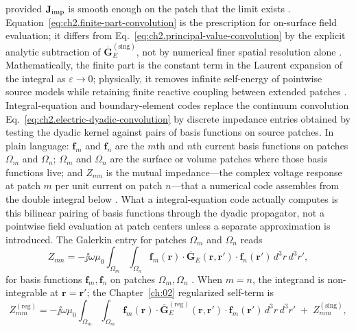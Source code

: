 provided \(\mathbf{J}_{\mathrm{imp}}\) is smooth enough on the patch that the limit exists
\cite{harrington2001}. Equation~\eqref{eq:ch2.finite-part-convolution} is the
prescription for on-surface field evaluation; it differs
from Eq.~\eqref{eq:ch2.principal-value-convolution} by the explicit analytic
subtraction of \(\overline{\mathbf{G}}_{E}^{\mathrm{(sing)}}\), not by numerical
finer spatial resolution alone \cite{stratton1941}. Mathematically, the finite part is the
constant term in the Laurent expansion of the integral as \(\varepsilon\to 0\);
physically, it removes infinite self-energy of pointwise source models while retaining
finite reactive coupling between extended patches \cite{jackson1999}.
Integral-equation and boundary-element codes replace the continuum convolution
Eq.~\eqref{eq:ch2.electric-dyadic-convolution} by discrete impedance entries obtained
by testing the dyadic kernel against pairs of basis functions on source patches. In plain
language: $\mathbf{f}_m$ and $\mathbf{f}_n$ are the $m$th and $n$th current basis functions
on patches $\Omega_m$ and $\Omega_n$; $\Omega_m$ and $\Omega_n$ are the surface or volume
patches where those basis functions live; and $Z_{mn}$ is the mutual impedance---the
complex voltage response at patch $m$ per unit current on patch $n$---that a numerical code
assembles from the double integral below \cite{harrington2001}. What a integral-equation code actually
computes is this bilinear pairing of basis functions through the dyadic propagator, not a
pointwise field evaluation at patch centers unless a separate approximation is introduced.
The Galerkin entry for patches \(\Omega_m\) and \(\Omega_n\) reads
\begin{equation}
\label{eq:ch2.mom-dyadic-entry}
Z_{mn}
=
-\jj\omega\mu_0\int_{\Omega_m}\int_{\Omega_n}
\mathbf{f}_m(\mathbf{r})\cdot
\overline{\mathbf{G}}_{E}(\mathbf{r},\mathbf{r}')\cdot
\mathbf{f}_n(\mathbf{r}')\,d^{3}r\,d^{3}r',
\end{equation}
for basis functions \(\mathbf{f}_m,\mathbf{f}_n\) on patches \(\Omega_m,\Omega_n\)
\cite{harrington2001}. When \(m=n\), the integrand is non-integrable at
\(\mathbf{r}=\mathbf{r}'\); the Chapter~\ref{ch:02} regularized self-term is
\begin{equation}
\label{eq:ch2.mom-self-term-regularized}
Z_{mm}^{\mathrm{(reg)}}
=
-\jj\omega\mu_0\int_{\Omega_m}\int_{\Omega_m}
\mathbf{f}_m(\mathbf{r})\cdot
\overline{\mathbf{G}}_{E}^{\mathrm{(reg)}}(\mathbf{r},\mathbf{r}')\cdot
\mathbf{f}_m(\mathbf{r}')\,d^{3}r\,d^{3}r'
\;+\;
Z_{mm}^{\mathrm{(sing)}},
\end{equation}
